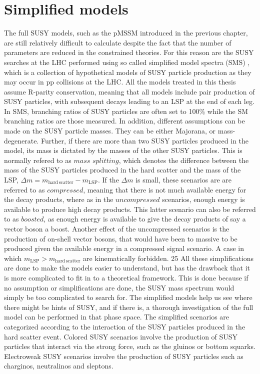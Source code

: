 \section{Simplified models}
\noindent\justify
The full SUSY models, such as the pMSSM introduced in the previous chapter, are still relatively difficult to calculate despite the fact that the number of parameters are reduced in the constrained theories.  
For this reason are the SUSY searches at the LHC performed using so called simplified model spectra (SMS) \cite{Alwall:2008ag,Alves:2011wf}, which is a collection of hypothetical models of SUSY particle production as they may occur in pp collisions at the LHC.
All the models treated in this thesis assume R-parity conservation, meaning that all models include pair production of SUSY particles, with subsequent decays leading to an LSP at the end of each leg.
In SMS, branching ratios of SUSY particles are often set to 100\% while the SM branching ratios are those measured. 
In addition, different assumptions can be made on the SUSY particle masses. They can be either Majorana, or mass-degenerate. 
Further, if there are more than two SUSY particles produced in the model, its mass is dictated by the masses of the other SUSY particles. 
This is normally refered to as $mass$ $splitting$, which denotes the difference between the mass of the SUSY particles produced in the hard scatter and the mass of the LSP, $\Delta m = m_{\mathrm{hard\,scatter}}-m_{\mathrm{LSP}}$.
If the $\Delta m$ is small, these scenarios are are referred to as $compressed$, meaning that there is not much available energy for the decay products, where as in the $uncompressed$ scenarios, enough energy is available to produce high \pt decay products. 
This latter scenario can also be referred to as $boosted$, as enough energy is available to give the decay products of say a vector boson a boost.   
Another effect of the uncompressed scenarios is the production of on-shell vector bosons, that would have been to massive to be produced given the available energy in a compressed signal scenario. 
A case in which $m_{\mathrm{LSP}}>m_{\mathrm{hard\,scatter}}$ are kinematically forbidden.  25 All these simplifications are done to make the models easier to understand, but has the drawback that it is more complicated to fit in to a theoretical framework.
This is done because if no assumption or simplifications are done, the SUSY mass spectrum would simply be too complicated to search for. 
The simplified models help us see where there might be hints of SUSY, and if there is, a thorough investigation of the full model can be performed in that phase space. 
The simplified scenarios are categorized according to the interaction of the SUSY particles produced in the  hard scatter event. 
Colored SUSY scenarios involve the production of SUSY particles that interact via the strong force, such as the gluinos or bottom squarks. 
Electroweak SUSY scenarios involve the production of SUSY particles such as charginos, neutralinos and sleptons. 
